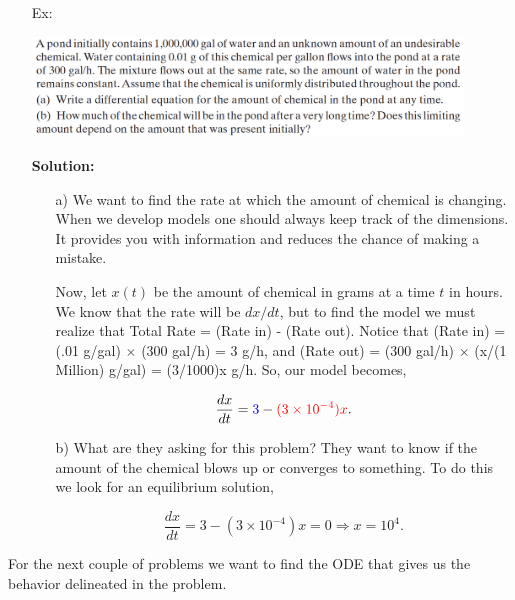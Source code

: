 \documentclass[reqno]{amsart}
\theoremstyle{definition}
\begin{document}
\begin{enumerate}

\item[Ex:  ]

\includegraphics[width = 0.9\textwidth]{BoyceDiPrima_pg9_Ex21}

\textbf{Solution:  }
\begin{enumerate}

\item[a)]  We want to find the rate at which the amount of chemical is changing.
When we develop models one should always keep track of the dimensions.  It
provides you with information and reduces the chance of making a mistake.

Now, let $x(t)$ be the amount of chemical in grams at a time $t$ in hours.
We know that the rate will be $dx/dt$, but to find the model we must realize
that Total Rate = {\color{blue}(Rate in)} - {\color{red}(Rate out)}.  Notice that
{\color{blue}(Rate in) = (.01 g/gal) $\times$ (300 gal/h) = 3 g/h},
and {\color{red}(Rate out) = (300 gal/h) $\times$ (x/(1 Million) g/gal) = (3/1000)x g/h}.  So, our
model becomes,

\begin{equation*}
\frac{dx}{dt} = {\color{blue}3} - {\color{red}(3 \times 10^{-4})x}.
\end{equation*}

\item[b)]  What are they asking for this problem?  They want to know if the amount
of the chemical blows up or converges to something.  To do this we look for an
equilibrium solution,

\begin{equation*}
\frac{dx}{dt} = 3 - (3 \times 10^{-4})x = 0 \Rightarrow x = 10^4.
\end{equation*}

\end{enumerate}

\end{enumerate}

\bigskip

For the next couple of problems we want to find the ODE that gives us the
behavior delineated in the problem.
\end{document}
